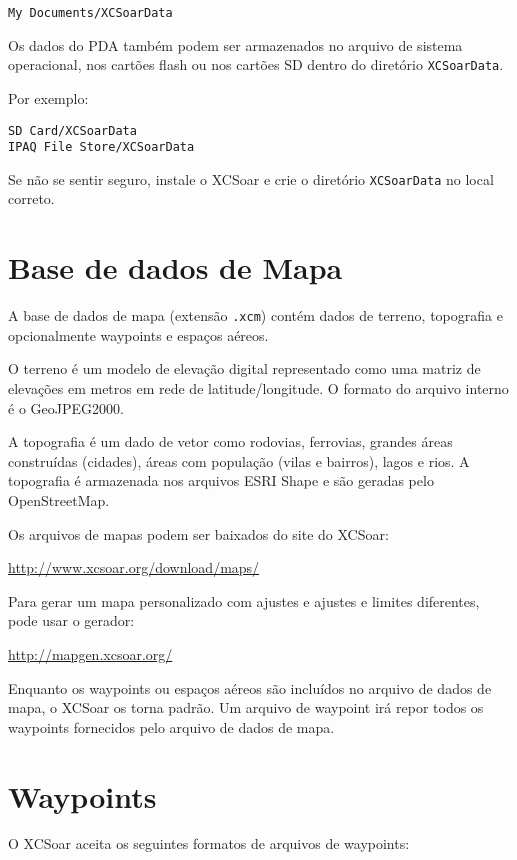 \begin{verbatim}
My Documents/XCSoarData
\end{verbatim}

Os dados do PDA também podem ser armazenados no arquivo de sistema operacional, nos cartões flash ou nos cartões SD dentro do diretório 
\verb|XCSoarData|.

Por exemplo:
\begin{verbatim}
SD Card/XCSoarData
IPAQ File Store/XCSoarData
\end{verbatim}

Se não se sentir seguro, instale o XCSoar e crie o diretório  \verb|XCSoarData|
no local correto. 
 

\section{Base de dados de Mapa}\label{sec:map}

A base de dados de mapa (extensão  \verb|.xcm|) contém dados de terreno, topografia e opcionalmente waypoints e espaços aéreos.

O terreno é um modelo de elevação digital representado como uma matriz de elevações em metros em rede de latitude/longitude.  O formato do arquivo interno é o GeoJPEG2000.

A topografia é um dado de vetor como rodovias, ferrovias, grandes áreas construídas (cidades), áreas com população (vilas e bairros), lagos e rios.  A topografia é armazenada nos arquivos ESRI Shape e são geradas pelo OpenStreetMap.

Os arquivos de mapas podem ser baixados do site do XCSoar:


\url{http://www.xcsoar.org/download/maps/}

Para gerar um mapa personalizado com ajustes e ajustes e limites diferentes, pode usar o gerador:

\url{http://mapgen.xcsoar.org/}

Enquanto os waypoints ou espaços aéreos são incluídos no arquivo de dados de mapa, o XCSoar os torna padrão.  Um arquivo de waypoint irá repor todos os waypoints fornecidos pelo arquivo de dados de mapa.

\section{Waypoints}

O XCSoar aceita os seguintes formatos de arquivos de waypoints:

